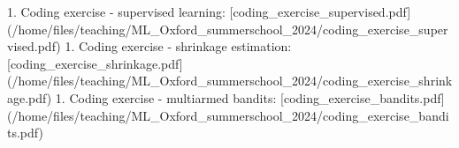 1. Coding exercise - supervised learning: [coding_exercise_supervised.pdf](/home/files/teaching/ML_Oxford_summerschool_2024/coding_exercise_supervised.pdf)  
1. Coding exercise - shrinkage estimation: [coding_exercise_shrinkage.pdf](/home/files/teaching/ML_Oxford_summerschool_2024/coding_exercise_shrinkage.pdf)  
1. Coding exercise - multiarmed bandits: [coding_exercise_bandits.pdf](/home/files/teaching/ML_Oxford_summerschool_2024/coding_exercise_bandits.pdf)  